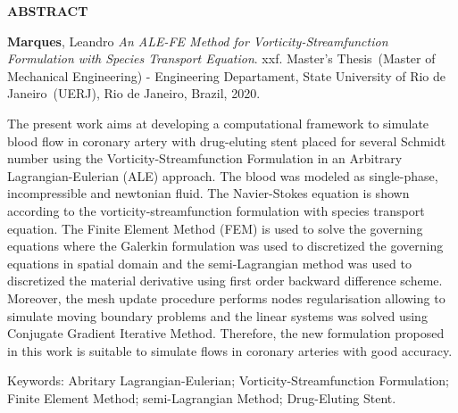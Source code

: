 \begin{center}
\textbf{ABSTRACT}
\end{center}


$\!$\\

\hspace{-1.3cm}\textbf{Marques}, Leandro \textit{An ALE-FE Method for Vorticity-Streamfunction Formulation with Species Transport Equation}. xxf. Master's Thesis~(Master of Mechanical Engineering) - Engineering Departament, State University of Rio de Janeiro~(UERJ), Rio de Janeiro, Brazil, 2020.

\vspace{.2cm}

\indent 
The present work aims at developing a 
computational framework to simulate blood flow 
in coronary artery with
drug-eluting stent placed for several Schmidt number using the Vorticity-Streamfunction 
Formulation in an Arbitrary Lagrangian-Eulerian (ALE) approach.
The blood was modeled as single-phase, incompressible 
and newtonian fluid. The Navier-Stokes equation is 
shown according to the vorticity-streamfunction 
formulation with species transport equation.
The Finite Element Method (FEM) is used to solve 
the governing equations where the Galerkin formulation was used
to discretized the governing equations in spatial domain 
and the semi-Lagrangian method was used to discretized 
the material derivative using first order backward difference scheme. 
Moreover, the mesh update procedure performs nodes regularisation
allowing to simulate moving boundary problems and
the linear systems was solved using Conjugate 
Gradient Iterative Method.
Therefore, the new formulation proposed in this work 
is suitable to simulate flows in coronary arteries with good accuracy. 

\vspace{1cm}

\hspace{-1.3cm}Keywords: Abritary Lagrangian-Eulerian; Vorticity-Streamfunction Formulation; Finite Element Method; semi-Lagrangian Method; Drug-Eluting Stent.
